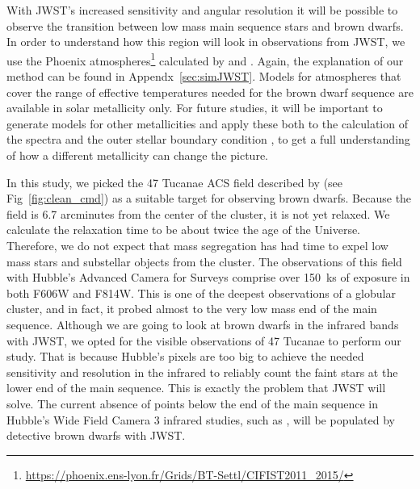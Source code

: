 \documentclass[useAMS,usenatbib]{mnras}
\begin{document}
With JWST's increased sensitivity and angular resolution it will be possible to observe the transition between low mass main sequence stars and brown dwarfs. In order to understand how this region will look in observations from JWST, we use the Phoenix atmospheres\footnote{\url{https://phoenix.ens-lyon.fr/Grids/BT-Settl/CIFIST2011\_2015/}} calculated by \citet{2015A&A...577A..42B} and \citet{2016Allard}. Again, the explanation of our method can be found in Appendx~\ref{sec:simJWST}. Models for atmospheres that cover the range of effective temperatures needed for the brown dwarf sequence are available in solar metallicity only. For future studies, it will be important to generate models for other metallicities and apply these both to the calculation of the spectra and the outer stellar boundary condition \citep{2015A&A...577A..42B}, to get a full understanding of how a different metallicity can change the picture.  

In this study, we picked the 47 Tucanae ACS field described by \citet{1538-3881-143-1-11} (see Fig~\ref{fig:clean_cmd}) as a suitable target for observing brown dwarfs.  Because the field is 6.7 arcminutes from the center of the cluster, it is not yet relaxed.  We calculate the relaxation time to be about twice the age of the Universe. Therefore, we do not expect that mass segregation has had time to expel low mass stars and substellar objects from the cluster.  The observations of this field with Hubble's Advanced Camera for Surveys comprise over 150~ks of exposure in both F606W and F814W.  This is one of the deepest observations of a globular cluster, and in fact, it probed almost to the very low mass end of the main sequence. Although we are going to look at brown dwarfs in the infrared bands with JWST, we opted for the visible observations of 47 Tucanae to perform our study. That is because Hubble's pixels are too big to achieve the needed sensitivity and resolution in the infrared to reliably count the faint stars at the lower end of the main sequence. This is exactly the problem that JWST will solve. The current absence of points below the end of the main sequence in Hubble's Wide Field Camera 3 infrared studies, such as \citet{2016ApJ...823...18C}, will be populated by detective brown dwarfs with JWST.
\end{document}
